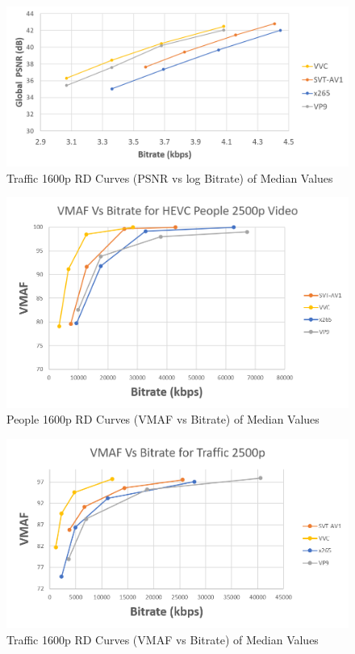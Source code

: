 \documentclass{book}
\begin{document}
\begin{figure}[hbt!]
	\centering
	\includegraphics[width=1.0\linewidth]{pictures/ch7/HEVC-1600p_logPSNR-Traf.png}
	\caption{Traffic 1600p RD Curves (PSNR vs log Bitrate) of Median Values}
	\label{fig:HEVC-1600p-logPSNR-Traf}
\end{figure}


\begin{figure}[hbt!]
	\centering
	\includegraphics[width=1.0\linewidth]{pictures/ch7/HEVC-1600p_BD-VMAF-Ppl.png}
	\caption{People 1600p RD Curves (VMAF vs Bitrate) of Median Values}
\label{fig:HEVC-1600p-VMAF-Ppl}
\end{figure}


\begin{figure}[hbt!]
	\centering
	\includegraphics[width=1.0\linewidth]{pictures/ch7/HEVC-1600p_BD-VMAF-Traf.png}
	\caption{Traffic 1600p RD Curves (VMAF vs Bitrate) of Median Values}
	\label{fig:HEVC-1600p-VMAF}
\end{figure}
\end{document}
